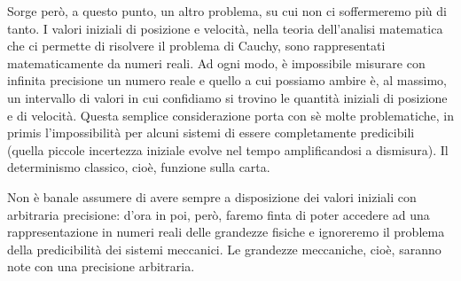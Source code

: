 \documentclass[a4paper,openany]{article}
\begin{document}
	Sorge però, a questo punto, un altro problema, su cui non ci soffermeremo più di tanto. I valori iniziali di posizione e velocità, nella teoria dell'analisi matematica che ci permette di risolvere il problema di Cauchy, sono rappresentati matematicamente da numeri reali. Ad ogni modo, è impossibile misurare con infinita precisione un numero reale e quello a cui possiamo ambire è, al massimo, un intervallo di valori in cui confidiamo si trovino le quantità iniziali di posizione e di velocità. Questa semplice considerazione porta con sè molte problematiche, in primis l'impossibilità per alcuni sistemi di essere completamente predicibili (quella piccole incertezza iniziale evolve nel tempo amplificandosi a dismisura). Il determinismo classico, cioè, funzione sulla carta. 
	
	Non è banale assumere di avere sempre a disposizione dei valori iniziali con arbitraria precisione: d'ora in poi, però, faremo finta di poter accedere ad una rappresentazione in numeri reali delle grandezze fisiche e ignoreremo il problema della predicibilità dei sistemi meccanici. Le grandezze meccaniche, cioè, saranno note con una precisione arbitraria.
\end{document}
